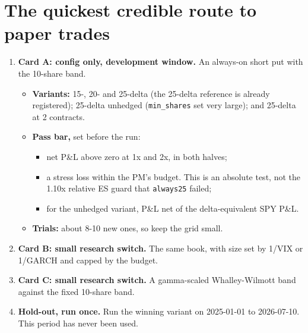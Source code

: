 \documentclass{article}
\begin{document}
\section{The quickest credible route to paper trades}

\begin{enumerate}

\item \textbf{Card A: config only, development window.} An always-on short put with the 10-share band.

\begin{itemize}

\item \textbf{Variants:} 15-, 20- and 25-delta (the 25-delta reference is already registered); 25-delta unhedged (\texttt{min\_\allowbreak{}shares} set very large); and 25-delta at 2 contracts.

\item \textbf{Pass bar,} set before the run:

\begin{itemize}

\item net P\&L above zero at 1x and 2x, in both halves;

\item a stress loss within the PM's budget. This is an absolute test, not the 1.10x relative ES guard that \texttt{always25} failed;

\item for the unhedged variant, P\&L net of the delta-equivalent SPY P\&L.

\end{itemize}

\item \textbf{Trials:} about 8-10 new ones, so keep the grid small.

\end{itemize}

\item \textbf{Card B: small research switch.} The same book, with size set by 1/\allowbreak{}VIX or 1/\allowbreak{}GARCH and capped by the budget.

\item \textbf{Card C: small research switch.} A gamma-scaled Whalley-Wilmott band against the fixed 10-share band.

\item \textbf{Hold-out, run once.} Run the winning variant on 2025-01-01 to 2026-07-10. This period has never been used.


\end{enumerate}
\end{document}
